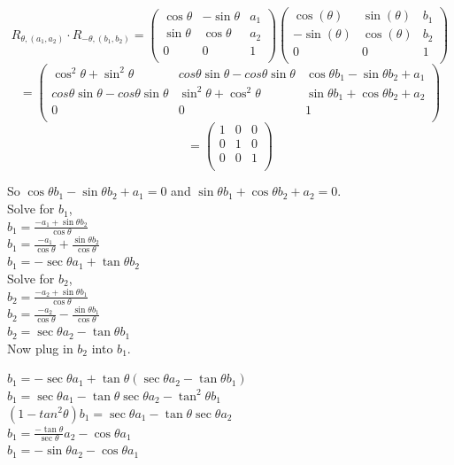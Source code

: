 \documentclass[12pt]{article}
\begin{document}
\[
R_{\theta, (a_1,a_2)} \cdot R_{-\theta, (b_1,b_2)} =
\begin{pmatrix}
\cos\theta & -\sin\theta & a_1 \\
\sin\theta & \cos\theta & a_2 \\
0 & 0 & 1 \\
\end{pmatrix}
\begin{pmatrix}
\cos(\theta) & \sin(\theta) & b_1 \\
-\sin(\theta) & \cos(\theta) & b_2 \\
0 & 0 & 1 \\
\end{pmatrix}
\]
\[
=
\begin{pmatrix}
\cos^2\theta + \sin^2\theta & cos\theta \sin\theta - cos\theta \sin\theta & \cos\theta b_1 - \sin \theta b_2 + a_1 \\
cos\theta \sin\theta - cos\theta \sin\theta & \sin^2\theta + \cos^2\theta  & \sin\theta b_1 + \cos\theta b_2 + a_2\\
0 & 0 & 1 \\
\end{pmatrix}
\]
\[
=
\begin{pmatrix}
1 & 0 & 0 \\
0 & 1  & 0 \\
0 & 0 & 1 \\
\end{pmatrix}
\]

So $\cos\theta b_1 - \sin \theta b_2 + a_1 = 0$ and $\sin\theta b_1 + \cos\theta b_2 + a_2 = 0$. \\

Solve for $b_1$, \\
$b_1 = \frac{- a_1 +  \sin \theta b_2}{\cos\theta}$ \\
$b_1 = \frac{- a_1}{\cos\theta} + \frac{\sin \theta b_2}{\cos\theta}$ \\
$b_1 = -\sec\theta a_1 + \tan\theta b_2$ \\

Solve for $b_2$, \\
$b_2 = \frac{- a_2 +  \sin \theta b_1}{\cos\theta}$  \\
$b_2 = \frac{- a_2}{\cos\theta} - \frac{\sin \theta b_1}{\cos\theta}$ \\
$b_2 = \sec\theta a_2 - \tan\theta b_1$ \\

Now plug in $b_2$ into $b_1$.

$b_1 = -\sec\theta a_1 + \tan\theta (\sec\theta a_2 - \tan\theta b_1)$ \\
$b_1 = \sec\theta a_1 - \tan\theta \sec\theta a_2 - \tan^2\theta b_1$ \\
$(1-tan^2\theta)b_1 = \sec\theta a_1 - \tan\theta \sec\theta a_2 $ \\
$b_1 = \frac{-\tan \theta}{\sec \theta}a_2 - \cos \theta a_1$ \\
$b_1 = - \sin \theta a_2 - \cos \theta a_1$ 
\end{document}
